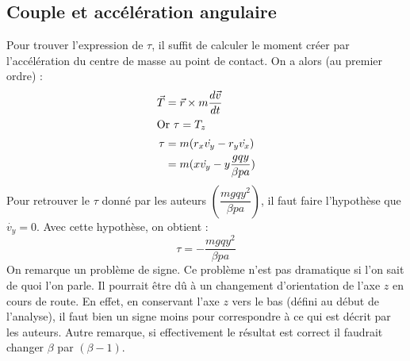 \documentclass[12pt,a4paper]{article}
\makeatletter
\renewcommand*{\eqref}[1]{%
	\hyperref[{#1}]{\textup{\tagform@{\ref*{#1}}}}%
}
\makeatother
\begin{document}
	\subsection{Couple et accélération angulaire}
	\label{subsec:acceleration-angulaire}
%	
	Pour trouver l'expression de $\tau$, il suffit de calculer le moment créer par l'accélération du centre de masse au point de contact. On a alors (au premier ordre) : 
	\begin{align*}
		\vec{T}	&=\vec{r}\times m\dfrac{d\vec{v}}{dt}\\
		\intertext{Or $\tau=T_z$}
		\tau&=m(r_x\dot{v_y}-r_y\dot{v_x})\\
			&=m(x\dot{v_y}-y\dfrac{gqy}{\beta p a})
	\end{align*}
	Pour retrouver le $\tau$ donné par les auteurs $\left(\dfrac{mgqy^2}{\beta p a}\right)$, il faut faire l'hypothèse que $\dot{v_y}=0$. Avec cette hypothèse, on obtient : 
	$$\tau=-\dfrac{mgqy^2}{\beta p a}$$
	On remarque un problème de signe. Ce problème n'est pas dramatique si l'on sait de quoi l'on parle. Il pourrait être dû à un changement d'orientation de l'axe $z$ en cours de route.
	En effet, en conservant l'axe $z$ vers le bas (défini au début de l'analyse), il faut bien un signe moins pour correspondre à ce qui est décrit par les auteurs.
	Autre remarque, si effectivement le résultat \eqref{eq:erreur} est correct il faudrait changer $\beta$ par $(\beta-1)$.
	
\end{document}
